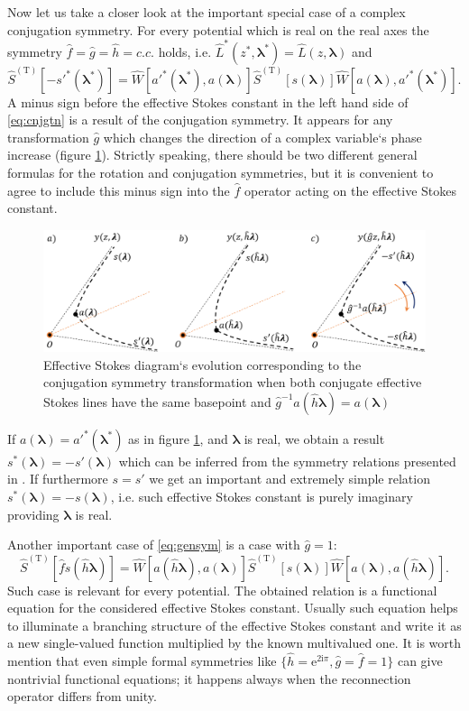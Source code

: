 \documentclass[atmp]{ipart_v1}
\def\rme{\mathrm{e}}
\def\rmi{\mathrm{i}}
\def\S{\widehat{S}}
\def\W{\widehat{W}}
\def\f{\hat{f}}
\def\g{\hat{g}}
\def\h{\hat{h}}
\def\LL{\widehat{L}}
\def\lmbd{\bm{\lambda}}
\def\Tp{\mathrm{T}}
\def\unity{1}
\newcommand\eref[1]{\eqref{#1}}
\newcommand\fref[1]{figure \ref{#1}}
\begin{document}
Now let us take a closer look at the important special case of a complex conjugation symmetry. 
For every potential which is real on the real axes the symmetry $\f=\g=\h=c.c.$ holds, 
i.e. $\LL^*(z^*,\lmbd^*)=\LL(z,\lmbd)$ and
\begin{equation}
\S^{(\Tp)} \left[ -s'^*(\lmbd^*) \right] = 
\W \left[ a'^*(\lmbd^*),a(\lmbd) \right]
\S^{(\Tp)} \left[ s(\lmbd) \right]
\W \left[ a(\lmbd),a'^*(\lmbd^*) \right].
\label{eq:cnjgtn}
\end{equation}
A minus sign before the effective Stokes constant in the left hand side of \eref{eq:cnjgtn} is a result 
of the conjugation symmetry. It appears for any transformation $\g$ which changes the direction 
of a complex variable`s phase increase (\fref{fig:cst}). Strictly speaking, there should be two 
different general formulas for the rotation and conjugation symmetries, but it is convenient 
to agree to include this minus sign into the $\f$ operator acting on the effective Stokes constant.

\begin{figure}
\centering
\noindent
\includegraphics[width=\textwidth]{stuff/cs.png}
\caption{Effective Stokes diagram`s evolution corresponding to the conjugation 
symmetry transformation when both conjugate effective Stokes lines have the same 
basepoint and $\g^{-1}a(\h\lmbd)=a(\lmbd)$}
\label{fig:cst}
\end{figure} 

If $a(\lmbd)=a'^*(\lmbd^*)$ as in \fref{fig:cst}, and $\lmbd$ is real, we obtain a result 
$s^*(\lmbd)=-s'(\lmbd)$ which can be inferred from the symmetry relations presented in \cite{symm}. 
If furthermore $s=s'$ we get an important and extremely simple relation $s^*(\lmbd)=-s(\lmbd)$, 
i.e. such effective Stokes constant is purely imaginary providing $\lmbd$ is real.

Another important case of \eref{eq:gensym} is a case with $\g=\unity$:
\begin{equation}
\S^{(\Tp)} \left[ \f s(\h\lmbd) \right] = 
\W \left[ a(\h\lmbd),a(\lmbd) \right]
\S^{(\Tp)} \left[ s(\lmbd) \right]
\W \left[ a(\lmbd),a(\h\lmbd) \right].
\label{eq:func}
\end{equation}
Such case is relevant for every potential. The obtained relation is a functional 
equation for the considered effective Stokes constant. Usually such equation helps to illuminate 
a branching structure of the effective Stokes constant and write it as a new single-valued function 
multiplied by the known multivalued one. 
It is worth mention that even simple formal 
symmetries like $\{\h=\rme^{2\rmi\pi},\g=\f=\unity\}$
can give nontrivial functional equations; it happens always when the reconnection operator
differs from unity.
\end{document}
